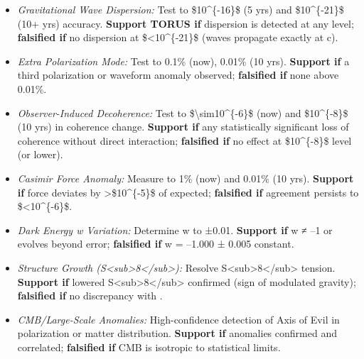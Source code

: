 \documentclass[
]{article}
\begin{document}
\begin{itemize}
\item
  \emph{Gravitational Wave Dispersion:} Test to \$10\^{}\{-16\}\$ (5
  yrs) and \$10\^{}\{-21\}\$ (10+ yrs) accuracy. \textbf{Support TORUS
  if} dispersion is detected at any level; \textbf{falsified if} no
  dispersion at \$\textless10\^{}\{-21\}\$ (waves propagate exactly at
  c)\hspace{0pt}.
\item
  \emph{Extra Polarization Mode:} Test to 0.1\% (now), 0.01\% (10 yrs).
  \textbf{Support if} a third polarization or waveform anomaly observed;
  \textbf{falsified if} none above 0.01\%\hspace{0pt}.
\item
  \emph{Observer-Induced Decoherence:} Test to
  \$\textbackslash sim10\^{}\{-6\}\$ (now) and \$10\^{}\{-8\}\$ (10 yrs)
  in coherence change. \textbf{Support if} any statistically significant
  loss of coherence without direct interaction; \textbf{falsified if} no
  effect at \$10\^{}\{-8\}\$ level (or lower)\hspace{0pt}.
\item
  \emph{Casimir Force Anomaly:} Measure to 1\% (now) and 0.01\% (10
  yrs). \textbf{Support if} force deviates by
  \textgreater\$10\^{}\{-5\}\$ of expected\hspace{0pt};
  \textbf{falsified if} agreement persists to \$\textless10\^{}\{-6\}\$.
\item
  \emph{Dark Energy w Variation:} Determine w to ±0.01. \textbf{Support
  if} w ≠ --1 or evolves beyond error; \textbf{falsified if} w = --1.000
  ± 0.005 constant\hspace{0pt}.
\item
  \emph{Structure Growth
  (S\textless sub\textgreater8\textless/sub\textgreater):} Resolve
  S\textless sub\textgreater8\textless/sub\textgreater{} tension.
  \textbf{Support if} lowered
  S\textless sub\textgreater8\textless/sub\textgreater{} confirmed (sign
  of modulated gravity)\hspace{0pt}; \textbf{falsified if} no
  discrepancy with \LambdaCDM.
\item
  \emph{CMB/Large-Scale Anomalies:} High-confidence detection of Axis of
  Evil in polarization or matter distribution. \textbf{Support if}
  anomalies confirmed and correlated\hspace{0pt}; \textbf{falsified if}
  CMB is isotropic to statistical limits\hspace{0pt}.
\end{itemize}
\end{document}

